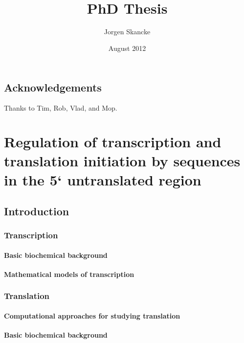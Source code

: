\documentclass[b5paper]{report}
\title{PhD Thesis}
\author{Jorgen Skancke}
\date{August 2012}
\begin{document}
 

\chapter*{Acknowledgements}
Thanks to Tim, Rob, Vlad, and Mop.

\maketitle

\part{Regulation of transcription and translation initiation by sequences in
the 5` untranslated region}

\chapter{Introduction}

%

\section{Transcription}

\subsection{Basic biochemical background}



\subsection{Mathematical models of transcription}

\section{Translation}

\subsection{Computational approaches for studying translation}

\subsection{Basic biochemical background}
\end{document}
